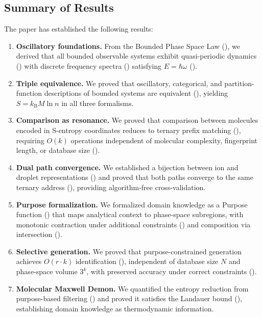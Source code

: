 \documentclass[11pt,twocolumn,a4paper]{article}
\theoremstyle{definition}
\theoremstyle{remark}
\newcommand{\kB}{k_{\mathrm{B}}}
\begin{document}
\subsection{Summary of Results}\label{sec:summary-results}

The paper has established the following results:

\begin{enumerate}[label=(\roman*)]
  \item \textbf{Oscillatory foundations.} From the Bounded Phase Space Law (), we derived that all bounded observable systems exhibit quasi-periodic dynamics () with discrete frequency spectra () satisfying $E = \hbar \omega$ ().

  \item \textbf{Triple equivalence.} We proved that oscillatory, categorical, and partition-function descriptions of bounded systems are equivalent (), yielding $S = \kB M \ln n$ in all three formalisms.

  \item \textbf{Comparison as resonance.} We proved that comparison between molecules encoded in S-entropy coordinates reduces to ternary prefix matching (), requiring $O(k)$ operations independent of molecular complexity, fingerprint length, or database size ().

  \item \textbf{Dual path convergence.} We established a bijection between ion and droplet representations () and proved that both paths converge to the same ternary address (), providing algorithm-free cross-validation.

  \item \textbf{Purpose formalization.} We formalized domain knowledge as a Purpose function () that maps analytical context to phase-space subregions, with monotonic contraction under additional constraints () and composition via intersection ().

  \item \textbf{Selective generation.} We proved that purpose-constrained generation achieves $O(r \cdot k)$ identification (), independent of database size $N$ and phase-space volume $3^k$, with preserved accuracy under correct constraints ().

  \item \textbf{Molecular Maxwell Demon.} We quantified the entropy reduction from purpose-based filtering () and proved it satisfies the Landauer bound (), establishing domain knowledge as thermodynamic information.
\end{enumerate}
\end{document}
